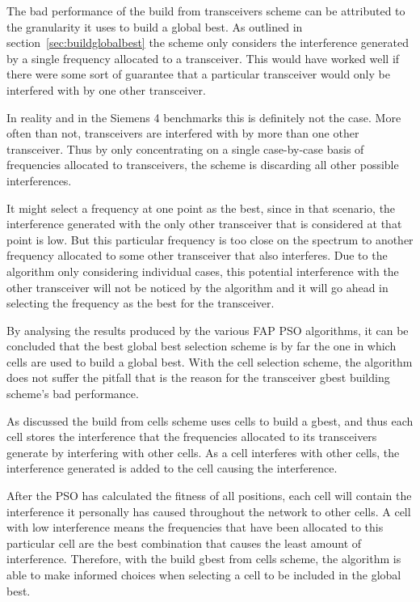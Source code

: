 The bad performance of the build from transceivers scheme can be attributed to the granularity it uses to build a global best. As outlined in section~\ref{sec:buildglobalbest} the scheme only considers the interference generated by a single frequency allocated to a transceiver. This would have worked well if there were some sort of guarantee that a particular transceiver would only be interfered with by one other transceiver.

In reality and in the Siemens 4 benchmarks this is definitely not the case. More often than not, transceivers are interfered with by more than one other transceiver. Thus by only concentrating on a single case-by-case basis of frequencies allocated to transceivers, the scheme is discarding all other possible interferences. 

It might select a frequency at one point as the best, since in that scenario, the interference generated with the only other transceiver that is considered at that point is low. But this particular frequency is too close on the spectrum to another frequency allocated to some other transceiver that also interferes. Due to the algorithm only considering individual cases, this potential interference with the other transceiver will not be noticed by the algorithm and it will go ahead in selecting the frequency as the best for the transceiver.

By analysing the results produced by the various FAP PSO algorithms, it can be concluded that the best global best selection scheme is by far the one in which cells are used to build a global best. With the cell selection scheme, the algorithm does not suffer the pitfall that is the reason for the transceiver gbest building scheme's bad performance.

As discussed the build from cells scheme uses cells to build a gbest, and thus each cell stores the interference that the frequencies allocated to its transceivers generate by interfering with other cells. As a cell interferes with other cells, the interference generated is added to the cell causing the interference.

After the PSO has calculated the fitness of all positions, each cell will contain the interference it personally has caused throughout the network to other cells. A cell with low interference means the frequencies that have been allocated to this particular cell are the best combination that causes the least amount of interference. Therefore, with the build gbest from cells scheme, the algorithm is able to make informed choices when selecting a cell to be included in the global best. 
